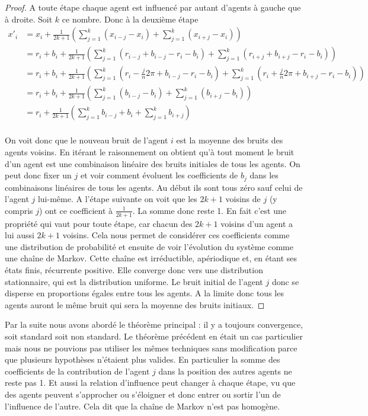 \documentclass[a4paper,10pt]{article}
\begin{document}
\begin{proof}
A toute étape chaque agent est influencé par autant d'agents à gauche que à droite. Soit $k$ ce nombre. Donc à la deuxième étape
\begin{equation*}
\begin{split}
x'_i &= x_i + \frac{1}{2k+1} \left( \sum_{j=1}^k (x_{i-j} - x_i) + \sum_{j=1}^k (x_{i+j} - x_i) \right) \\
     &= r_i + b_i + \frac{1}{2k+1} \left( \sum_{j=1}^k (r_{i-j} + b_{i-j} - r_i - b_i) + \sum_{j=1}^k (r_{i+j} + b_{i+j} - r_i - b_i) \right) \\
     &= r_i + b_i + \frac{1}{2k+1} \left( \sum_{j=1}^k (r_i - \frac{j}{n}2 \pi + b_{i-j} - r_i - b_i) + \sum_{j=1}^k (r_i + \frac{j}{n}2 \pi + b_{i+j} - r_i - b_i) \right) \\
     &= r_i + b_i + \frac{1}{2k+1} \left( \sum_{j=1}^k (b_{i-j} - b_i) + \sum_{j=1}^k (b_{i+j} - b_i) \right) \\
     &= r_i + \frac{1}{2k+1} \left( \sum_{j=1}^k b_{i-j} + b_i + \sum_{j=1}^k b_{i+j} \right) \\
\end{split}
\end{equation*}

On voit donc que le nouveau bruit de l'agent $i$ est la moyenne des bruits des agents voisins. En itérant le raisonnement on obtient qu'à tout moment le bruit d'un agent est une combinaison linéaire des bruits initiales de tous les agents. On peut donc fixer un $j$ et voir comment évoluent les coefficients de $b_j$ dans les combinaisons linéaires de tous les agents. Au début ils sont tous zéro sauf celui de l'agent $j$ lui-même. A l’étape suivante on voit que les $2k+1$ voisins de $j$ (y compris $j$) ont ce coefficient à $\frac{1}{2k+1}$. La somme donc reste 1. En fait c'est une propriété qui vaut pour toute étape, car chacun des $2k+1$ voisins d'un agent a lui aussi $2k+1$ voisins. Cela nous permet de considérer ces coefficients comme une distribution de probabilité et ensuite de voir l’évolution du système comme une chaîne de Markov. Cette chaîne est irréductible, apériodique et, en étant ses états finis, récurrente positive. Elle converge donc vers une distribution stationnaire, qui est la distribution uniforme. Le bruit initial de l'agent $j$ donc se disperse en proportions égales entre tous les agents. A la limite donc tous les agents auront le même bruit qui sera la moyenne des bruits initiaux.
\end{proof}

Par la suite nous avons abordé le théorème principal : il y a toujours convergence, soit standard soit non standard. Le théorème précédent en était un cas particulier mais nous ne pouvions pas utiliser les mêmes techniques sans modification parce que plusieurs hypothèses n’étaient plus valides. En particulier la somme des coefficients de la contribution de l'agent $j$ dans la position des autres agents ne reste pas 1. Et aussi la relation d'influence peut changer à chaque étape, vu que des agents peuvent s'approcher ou s’éloigner et donc entrer ou sortir l'un de l'influence de l'autre. Cela dit que la chaîne de Markov n'est pas homogène.
\end{document}
